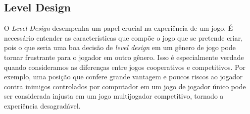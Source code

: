 \subsection{Level Design}\label{subsec:levelDesign}
O \textit{Level Design} desempenha um papel crucial na experiência de um jogo. É necessário entender as características que compõe o jogo que se pretende criar, pois o que seria uma boa decisão de \textit{level design} em um gênero de jogo pode tornar frustrante para o jogador em outro gênero. Isso é especialmente verdade quando consideramos as diferenças entre jogos cooperativos e competitivos. Por exemplo, uma posição que confere grande vantagem e poucos riscos ao jogador contra inimigos controlados por computador em um jogo de jogador único pode ser considerada injusta em um jogo multijogador competitivo, tornado a experiência desagradável.

